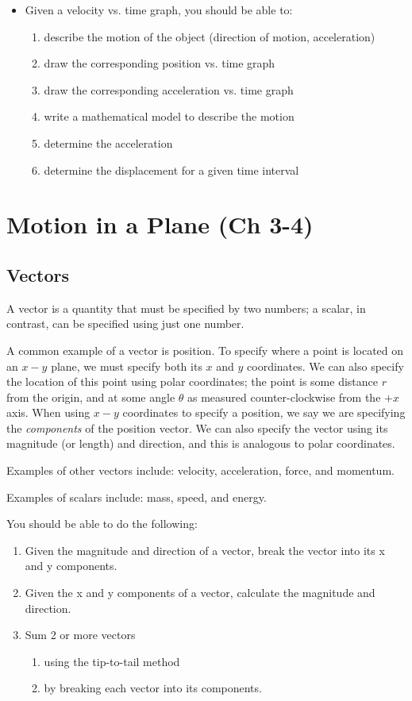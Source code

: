 \begin{itemize}
\item Given a velocity vs. time graph, you should be able to: 
\begin{enumerate}
\item describe the motion of the object (direction of motion, acceleration) 
\item draw the corresponding position vs. time graph 
\item draw the corresponding acceleration vs. time graph 
\item write a mathematical model to describe the motion 
\item determine the acceleration 
\item determine the displacement for a given time interval 
\end{enumerate}
\end{itemize}

\vspace*{-.15in}
\section{Motion in a Plane (Ch 3-4)}
\vspace*{-.15in}
\subsection{Vectors }

A vector is a quantity that must be specified by two numbers; a
scalar, in contrast, can be specified using just one number.  

A common example of a vector is position.  To specify where a point is
located on an $x-y$ plane, we must specify both its $x$ and $y$
coordinates.  We can also specify the location of this point using
polar coordinates; the point is some distance $r$ from the origin, and
at some angle $\theta$ as measured counter-clockwise from the $+x$
axis.  When using $x-y$ coordinates to specify a position, we say we
are specifying the {\it components} of the position vector.  We can
also specify the vector using its magnitude (or length) and direction, and this is
analogous to polar coordinates.

Examples of other vectors include: velocity, acceleration, force, and momentum.

Examples of scalars include: mass, speed, and energy.

You should be able to do the following:
\begin{enumerate}
\item Given the magnitude and direction of a vector, break the vector into its x and y components.
\item Given the x and y components of a vector, calculate the magnitude and direction.
\item Sum 2 or more vectors
\begin{enumerate}
\item using the tip-to-tail method
\item by breaking each vector into its components.
\end{enumerate}
\end{enumerate}

